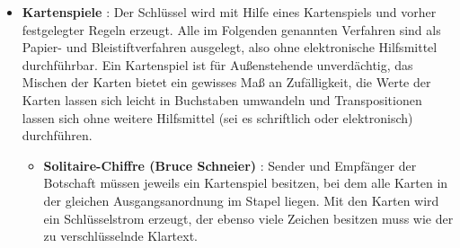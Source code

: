 \begin{refsegment}
\begin{itemize}
\item \textbf{Kartenspiele} \cite{Savard1999}:
   Der Schlüssel wird mit Hilfe eines Kartenspiels und vorher festgelegter
   Regeln erzeugt. Alle im Folgenden genannten Verfahren sind als
   Papier- und Bleistiftverfahren ausgelegt, also ohne elektronische
   Hilfsmittel durchführbar. Ein Kartenspiel ist für Außenstehende
   unverdächtig, das Mischen der Karten bietet ein gewisses Maß an
   Zufälligkeit, die Werte der Karten lassen sich leicht in Buchstaben
   umwandeln und Transpositionen lassen sich ohne weitere Hilfsmittel
   (sei es schriftlich oder elektronisch) durchführen.
   \begin{itemize}
      \item \textbf{Solitaire-Chiffre (Bruce Schneier)\footnotemark}
         \cite{Schneier1999}:
         Sender und Empfänger der Botschaft müssen jeweils ein Kartenspiel
         besitzen, bei dem alle Karten in der gleichen Ausgangsanordnung
         im Stapel liegen. Mit den Karten wird ein Schlüsselstrom erzeugt,
         der ebenso viele Zeichen besitzen muss wie der zu verschlüsselnde
         Klartext.


\end{itemize}
\end{itemize}
\end{refsegment}
